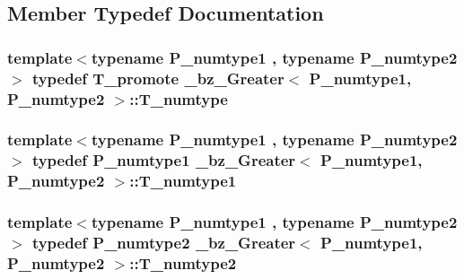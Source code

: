 \subsection{Member Typedef Documentation}
\hypertarget{class__bz__Greater_a01f30906fb2e83c8eb87eeb6c6d79338}{}
\subsubsection[{T\+\_\+numtype}]{\setlength{\rightskip}{0pt plus 5cm}template$<$typename P\+\_\+numtype1 , typename P\+\_\+numtype2 $>$ typedef {\bf T\+\_\+promote} {\bf \+\_\+bz\+\_\+\+Greater}$<$ P\+\_\+numtype1, P\+\_\+numtype2 $>$\+::{\bf T\+\_\+numtype}}\label{class__bz__Greater_a01f30906fb2e83c8eb87eeb6c6d79338}
\hypertarget{class__bz__Greater_a8ddeec6476cc619ba71eba079979b2dd}{}
\subsubsection[{T\+\_\+numtype1}]{\setlength{\rightskip}{0pt plus 5cm}template$<$typename P\+\_\+numtype1 , typename P\+\_\+numtype2 $>$ typedef P\+\_\+numtype1 {\bf \+\_\+bz\+\_\+\+Greater}$<$ P\+\_\+numtype1, P\+\_\+numtype2 $>$\+::{\bf T\+\_\+numtype1}}\label{class__bz__Greater_a8ddeec6476cc619ba71eba079979b2dd}
\hypertarget{class__bz__Greater_a9c67f61cf53f43956b139ca9585f3ee8}{}
\subsubsection[{T\+\_\+numtype2}]{\setlength{\rightskip}{0pt plus 5cm}template$<$typename P\+\_\+numtype1 , typename P\+\_\+numtype2 $>$ typedef P\+\_\+numtype2 {\bf \+\_\+bz\+\_\+\+Greater}$<$ P\+\_\+numtype1, P\+\_\+numtype2 $>$\+::{\bf T\+\_\+numtype2}}\label{class__bz__Greater_a9c67f61cf53f43956b139ca9585f3ee8}
\hypertarget{class__bz__Greater_a32899f8ff0733ed0194152237a3ad62f}{}
